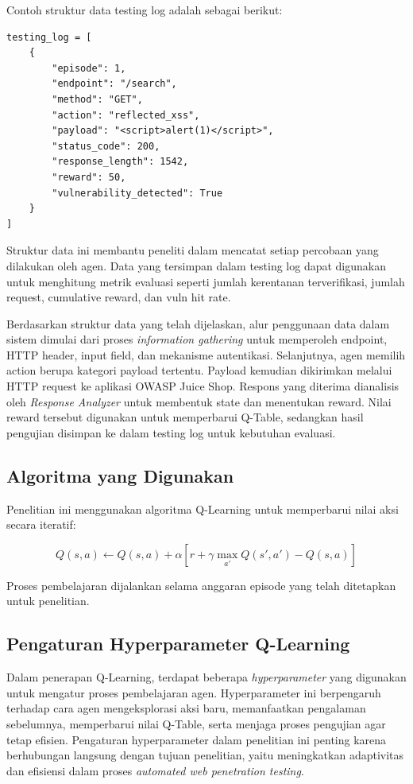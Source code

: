 Contoh struktur data testing log adalah sebagai berikut:

\begin{verbatim}
testing_log = [
    {
        "episode": 1,
        "endpoint": "/search",
        "method": "GET",
        "action": "reflected_xss",
        "payload": "<script>alert(1)</script>",
        "status_code": 200,
        "response_length": 1542,
        "reward": 50,
        "vulnerability_detected": True
    }
]
\end{verbatim}

Struktur data ini membantu peneliti dalam mencatat setiap percobaan yang dilakukan oleh agen. Data yang tersimpan dalam testing log dapat digunakan untuk menghitung metrik evaluasi seperti jumlah kerentanan terverifikasi, jumlah request, cumulative reward, dan vuln hit rate.

Berdasarkan struktur data yang telah dijelaskan, alur penggunaan data dalam sistem dimulai dari proses \textit{information gathering} untuk memperoleh endpoint, HTTP header, input field, dan mekanisme autentikasi. Selanjutnya, agen memilih action berupa kategori payload tertentu. Payload kemudian dikirimkan melalui HTTP request ke aplikasi OWASP Juice Shop. Respons yang diterima dianalisis oleh \textit{Response Analyzer} untuk membentuk state dan menentukan reward. Nilai reward tersebut digunakan untuk memperbarui Q-Table, sedangkan hasil pengujian disimpan ke dalam testing log untuk kebutuhan evaluasi.

\subsection{Algoritma yang Digunakan}
Penelitian ini menggunakan algoritma Q-Learning untuk memperbarui nilai aksi secara iteratif:

\begin{equation}
Q(s,a) \leftarrow Q(s,a) + \alpha \left[ r + \gamma \max_{a'} Q(s',a') - Q(s,a) \right]
\end{equation}

Proses pembelajaran dijalankan selama anggaran episode yang telah ditetapkan untuk penelitian.

\subsection{Pengaturan Hyperparameter Q-Learning}

Dalam penerapan Q-Learning, terdapat beberapa \textit{hyperparameter} yang digunakan untuk mengatur proses pembelajaran agen. Hyperparameter ini berpengaruh terhadap cara agen mengeksplorasi aksi baru, memanfaatkan pengalaman sebelumnya, memperbarui nilai Q-Table, serta menjaga proses pengujian agar tetap efisien. Pengaturan hyperparameter dalam penelitian ini penting karena berhubungan langsung dengan tujuan penelitian, yaitu meningkatkan adaptivitas dan efisiensi dalam proses \textit{automated web penetration testing}. 

